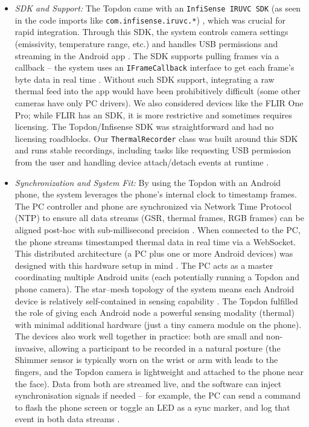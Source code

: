 \documentclass{report}
\begin{document}
\begin{itemize}
        \item \textit{SDK and Support:} The Topdon came with an \texttt{InfiSense IRUVC SDK} (as seen in the code imports like \texttt{com.infisense.iruvc.*}) \cite{infisense16}, which was crucial for rapid integration. Through this SDK, the system controls camera settings (emissivity, temperature range, etc.) and handles USB permissions and streaming in the Android app \cite{infisense16}. The SDK supports pulling frames via a callback -- the system uses an \texttt{IFrameCallback} interface to get each frame's byte data in real time \cite{infisense16}. Without such SDK support, integrating a raw thermal feed into the app would have been prohibitively difficult (some other cameras have only PC drivers). We also considered devices like the FLIR One Pro; while FLIR has an SDK, it is more restrictive and sometimes requires licensing. The Topdon/Infisense SDK was straightforward and had no licensing roadblocks. Our \texttt{ThermalRecorder} class was built around this SDK and runs stable recordings, including tasks like requesting USB permission from the user and handling device attach/detach events at runtime \cite{infisense16}.

        \item \textit{Synchronization and System Fit:} By using the Topdon with an Android phone, the system leverages the phone's internal clock to timestamp frames. The PC controller and phone are synchronized via Network Time Protocol (NTP) to ensure all data streams (GSR, thermal frames, RGB frames) can be aligned post-hoc with sub-millisecond precision \cite{shimmerapi15}. When connected to the PC, the phone streams timestamped thermal data in real time via a WebSocket. This distributed architecture (a PC plus one or more Android devices) was designed with this hardware setup in mind \cite{shimmerapi15}. The PC acts as a master coordinating multiple Android units (each potentially running a Topdon and phone camera). The star--mesh topology of the system means each Android device is relatively self-contained in sensing capability \cite{shimmerapi15}. The Topdon fulfilled the role of giving each Android node a powerful sensing modality (thermal) with minimal additional hardware (just a tiny camera module on the phone). The devices also work well together in practice: both are small and non-invasive, allowing a participant to be recorded in a natural posture (the Shimmer sensor is typically worn on the wrist or arm with leads to the fingers, and the Topdon camera is lightweight and attached to the phone near the face). Data from both are streamed live, and the software can inject synchronisation signals if needed -- for example, the PC can send a command to flash the phone screen or toggle an LED as a sync marker, and log that event in both data streams \cite{syncmarker21}.
    \end{itemize}
\end{document}
